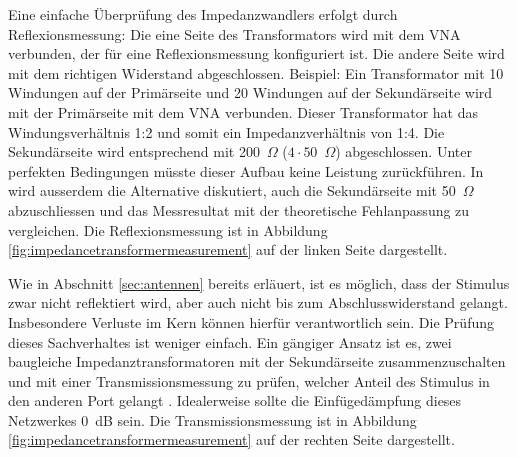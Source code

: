 \documentclass[twoside,a4paper,11pt,halfparskip,DIV=11,notitlepage]{scrartcl}
\newcommand{\Ohm}{$\Omega$\xspace}
\begin{document}
Eine einfache Überprüfung des Impedanzwandlers erfolgt durch Reflexionsmessung: Die eine Seite
des Transformators wird mit dem VNA verbunden, der für eine Reflexionsmessung konfiguriert ist.
Die andere Seite wird mit dem richtigen Widerstand abgeschlossen. Beispiel: Ein Transformator
mit 10 Windungen auf der Primärseite und 20 Windungen auf der Sekundärseite
wird mit der Primärseite mit dem VNA verbunden. Dieser Transformator hat das Windungsverhältnis
1:2 und somit ein Impedanzverhältnis von 1:4. Die Sekundärseite wird entsprechend mit 200~\Ohm
($4\cdot 50$~\Ohm) abgeschlossen. Unter perfekten Bedingungen müsste dieser Aufbau keine
Leistung zurückführen. In \cite{ferreira2019evaluating} wird ausserdem die Alternative diskutiert,
auch die Sekundärseite mit 50~\Ohm abzuschliessen und das Messresultat mit der theoretische
Fehlanpassung zu vergleichen. Die Reflexionsmessung ist in Abbildung \ref{fig:impedancetransformermeasurement}
auf der linken Seite dargestellt.

Wie in Abschnitt \ref{sec:antennen} bereits erläuert, ist es möglich, dass der Stimulus zwar
nicht reflektiert wird, aber auch nicht bis zum Abschlusswiderstand gelangt. Insbesondere
Verluste im Kern können hierfür verantwortlich sein. Die Prüfung dieses Sachverhaltes ist
weniger einfach. Ein gängiger Ansatz ist es, zwei baugleiche Impedanztransformatoren mit
der Sekundärseite zusammenzuschalten und mit einer Transmissionsmessung zu prüfen, welcher
Anteil des Stimulus in den anderen Port gelangt \cite{ferreira2019evaluating}.
Idealerweise sollte die Einfügedämpfung dieses Netzwerkes 0~dB sein. Die Transmissionsmessung
ist in Abbildung \ref{fig:impedancetransformermeasurement} auf der rechten Seite dargestellt.
\end{document}
